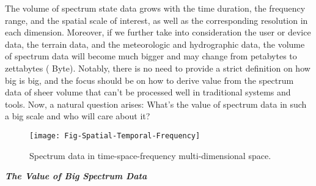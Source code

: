 \documentclass[12pt,draftcls,journal,letterpaper,oneside,onecolumn]{IEEEtran}
\begin{document}
The volume of spectrum state data grows with the time duration, the frequency range, and the spatial scale of interest, as well as the corresponding resolution in each dimension. Moreover, if we further take into consideration the user or device data, the terrain data, and the meteorologic and hydrographic data, the volume of spectrum data will become much bigger and may change from petabytes to zettabytes ( Byte). Notably, there is no need to provide a strict definition on how big is big, and the focus should be on how to derive value from the spectrum data of sheer volume that can't be processed well in traditional systems and tools. Now, a natural question arises: What's the value of spectrum data in such a big scale and who will care about it?
\\

\begin{figure}[!t]
\centering
\texttt{[image: Fig-Spatial-Temporal-Frequency]}
\caption{Spectrum data in time-space-frequency multi-dimensional space.}
\label{Fig-Spatial-Temporal-Frequency}
\end{figure}




\textbf{\emph{The Value of Big Spectrum Data}}
\end{document}
